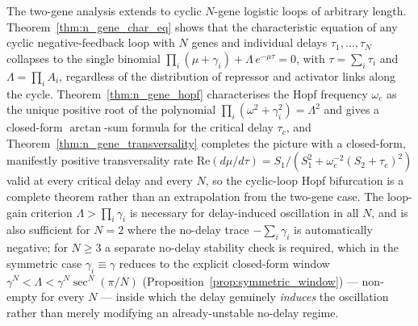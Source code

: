 \documentclass[sn-mathphys,Numbered]{sn-jnl}
\theoremstyle{thmstyleone}
\theoremstyle{thmstyletwo}
\theoremstyle{thmstylethree}
\begin{document}
The two-gene analysis extends to cyclic $N$-gene logistic loops of
arbitrary length. Theorem~\ref{thm:n_gene_char_eq} shows that the
characteristic equation of any cyclic negative-feedback loop with $N$
genes and individual delays $\tau_1,\ldots,\tau_N$ collapses to the
single binomial $\prod_i(\mu+\gamma_i)+\Lambda\,e^{-\mu\tau}=0$, with
$\tau=\sum_i\tau_i$ and $\Lambda=\prod_i A_i$, regardless of the
distribution of repressor and activator links along the cycle.
Theorem~\ref{thm:n_gene_hopf} characterises the Hopf frequency
$\omega_c$ as the unique positive root of the polynomial
$\prod_i(\omega^2+\gamma_i^2)=\Lambda^2$ and gives a closed-form
$\arctan$-sum formula for the critical delay $\tau_c$, and
Theorem~\ref{thm:n_gene_transversality} completes the picture with a
closed-form, manifestly positive transversality rate
$\mathrm{Re}(d\mu/d\tau)=S_1/(S_1^2+\omega_c^{-2}(S_2+\tau_c)^2)$
valid at every critical delay and every $N$, so the cyclic-loop Hopf
bifurcation is a complete theorem rather than an extrapolation from the
two-gene case. The loop-gain criterion $\Lambda>\prod_i\gamma_i$ is
necessary for delay-induced oscillation in all $N$, and is also
sufficient for $N=2$ where the no-delay trace $-\sum_i\gamma_i$ is
automatically negative; for $N\geq 3$ a separate no-delay stability
check is required, which in the symmetric case
$\gamma_i\equiv\gamma$ reduces to the explicit closed-form window
$\gamma^N<\Lambda<\gamma^N\sec^N(\pi/N)$
(Proposition~\ref{prop:symmetric_window}) --- non-empty for every
$N$ --- inside which the delay genuinely \emph{induces} the
oscillation rather than merely modifying an already-unstable
no-delay regime.
\end{document}
